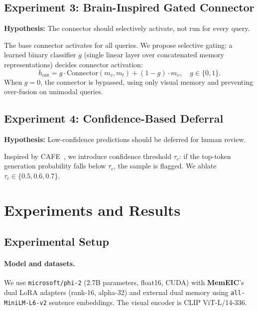 \documentclass[11pt]{article}
\newcommand{\memeic}{\textbf{MemEIC}}
\begin{document}
\subsection{Experiment 3: Brain-Inspired Gated Connector}
\label{sec:exp3_gated}

\textbf{Hypothesis:} The connector should selectively activate, not run for
every query.

The base connector activates for all queries. We propose selective gating: a
learned binary classifier $g$ (single linear layer over concatenated memory
representations) decides connector activation:
\begin{equation}
  h_{\text{out}} = g \cdot \text{Connector}(m_v, m_t) + (1-g) \cdot m_v,
  \quad g \in \{0, 1\}.
\end{equation}
When $g=0$, the connector is bypassed, using only visual memory and preventing
over-fusion on unimodal queries.

\subsection{Experiment 4: Confidence-Based Deferral}
\label{sec:exp4_deferral}

\textbf{Hypothesis:} Low-confidence predictions should be deferred for human
review.

Inspired by CAFE~\citep{chen2024cafe}, we introduce confidence threshold $\tau_c$:
if the top-token generation probability falls below $\tau_c$, the sample is
flagged. We ablate $\tau_c \in \{0.5, 0.6, 0.7\}$.

\section{Experiments and Results}
\label{sec:exp}

\subsection{Experimental Setup}
\label{sec:setup}

\paragraph{Model and datasets.}
We use \texttt{microsoft/phi-2} (2.7B parameters, float16, CUDA) with
\memeic{}'s dual LoRA adapters (rank-16, alpha-32) and external dual memory
using \texttt{all-MiniLM-L6-v2} sentence embeddings. The visual encoder is
CLIP ViT-L/14-336.
\end{document}
